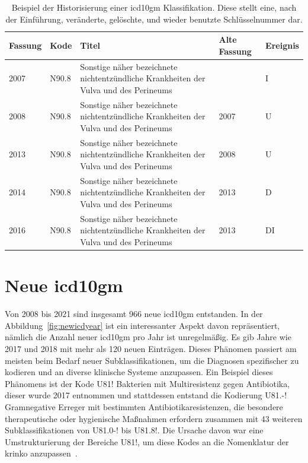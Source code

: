 \begin{table}[ht]
	\centering
	\small
	\caption[Beispiel der Historisierung einer \acs{icd10gm} Klassifikation]{Beispiel der Historisierung einer \acs{icd10gm} Klassifikation. Diese stellt eine, nach der Einführung, veränderte, gelöschte, und wieder benutzte Schlüsselnummer dar.}
	\label{tab:IUDDI}
	\begin{tabular}{|l|l|p{6cm}|l|l|}
		\hline
		\rowcolor{lightgray} Fassung & Kode & Titel & Alte Fassung & Ereignis \\ \hline
		2007 & N90.8  & Sonstige näher bezeichnete nichtentzündliche Krankheiten der Vulva und des Perineums &  & I \\ \hline
		2008 & N90.8  & Sonstige näher bezeichnete nichtentzündliche Krankheiten der Vulva und des Perineums & 2007 & U \\ \hline
		2013 & N90.8  & Sonstige näher bezeichnete nichtentzündliche Krankheiten der Vulva und des Perineums & 2008 & U \\ \hline
		2014 & N90.8  & Sonstige näher bezeichnete nichtentzündliche Krankheiten der Vulva und des Perineums & 2013 & D \\ \hline
		2016 & N90.8  & Sonstige näher bezeichnete nichtentzündliche Krankheiten der Vulva und des Perineums & 2013 & DI \\ \hline
	\end{tabular}
\end{table}

\section{Neue \acs{icd10gm}} \label{sec:newicd}

Von 2008 bis 2021 sind insgesamt 966 neue \ac{icd10gm} entstanden. In der Abbildung~\ref{fig:newicdyear} ist ein interessanter Aspekt davon repräsentiert, nämlich die Anzahl neuer \ac{icd10gm} pro Jahr ist unregelmäßig. Es gib Jahre wie 2017 und 2018 mit mehr als 120 neuen Einträgen. Dieses Phänomen passiert am meisten beim Bedarf neuer Subklassifikationen, um die Diagnosen spezifischer zu kodieren und an diverse klinische Systeme anzupassen. Ein Beispiel dieses Phänomens ist der Kode \textsf{U81!} \textsf{Bakterien mit Multiresistenz gegen Antibiotika}, dieser wurde 2017 entnommen und stattdessen entstand die Kodierung \textsf{U81.-!} \textsf{Gramnegative Erreger mit bestimmten Antibiotikaresistenzen, die besondere therapeutische oder hygienische Maßnahmen erfordern} zusammen mit 43 weiteren Subklassifikationen von \textsf{U81.0-!} bis \textsf{U81.8!}. Die Ursache davon war eine Umstrukturierung der Bereiche \textsf{U81!}, um diese Kodes an die Nomenklatur der \ac{krinko} anzupassen~\cite{erreg17}.

